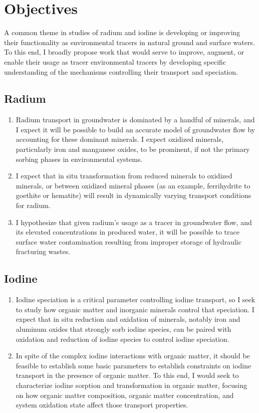 \documentclass[twoside,12pt,titlepage]{article}
\begin{document}
\section{Objectives}

A common theme in studies of radium and iodine is developing or improving their functionality as environmental tracers in natural ground and surface waters. To this end, I broadly propose work that would serve to improve, augment, or enable their usage as tracer environmental tracers by developing specific understanding of the mechanisms controlling their transport and speciation.
\subsection{Radium}

\begin{enumerate}[label=\arabic*)]
	\item Radium transport in groundwater is dominated by a handful of minerals, and I expect it will be possible to build an accurate model of groundwater flow by accounting for these dominant minerals. I expect oxidized minerals, particularly iron and manganese oxides, to be prominent, if not the primary sorbing phases in environmental systems.
	\item I expect that in situ transformation from reduced minerals to oxidized minerals, or between oxidized mineral phases (as an example, ferrihydrite to goethite or hematite) will result in dynamically varying transport conditions for radium.
	\item I hypothesize that given radium's usage as a tracer in groundwater flow, and its elevated concentrations in produced water, it will be possible to trace surface water contamination resulting from improper storage of hydraulic fracturing wastes.
\end{enumerate}

\subsection{Iodine}

\begin{enumerate}[label = \arabic*)]
	\item Iodine speciation is a critical parameter controlling iodine transport, so I seek to study how organic matter and inorganic minerals control that speciation. I expect that in situ reduction and oxidation of minerals, notably iron and aluminum oxides that strongly sorb iodine species, can be paired with oxidation and reduction of iodine species to control iodine speciation.
	\item In spite of the complex iodine interactions with organic matter, it should be feasible to establish some basic parameters to establish constraints on iodine transport in the presence of organic matter. To this end, I would seek to characterize iodine sorption and transformation in organic matter, focusing on how organic matter composition, organic matter concentration, and system oxidation state affect those transport properties.

\end{enumerate}
\end{document}
